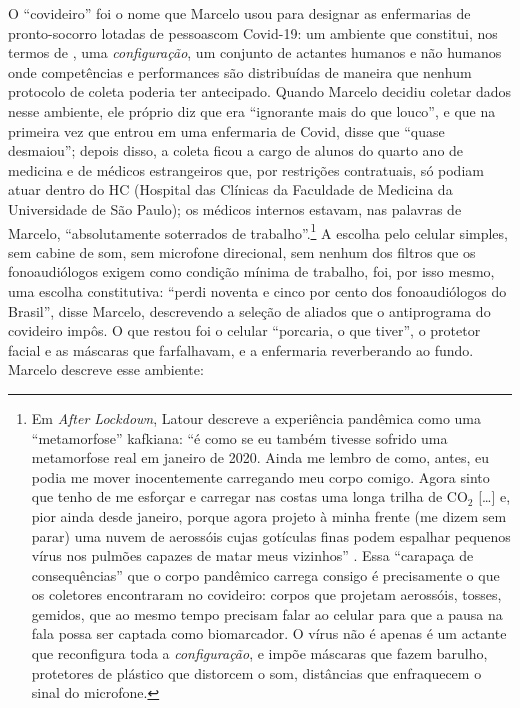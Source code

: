 O \enquote{covideiro} foi o nome que Marcelo usou para designar as enfermarias de pronto-socorro lotadas de pessoascom Covid-19: um ambiente que constitui, nos termos de \textcite{Akrich1992Description}, uma \textit{configuração}, um conjunto de actantes humanos e não humanos onde competências e performances são distribuídas de maneira que nenhum protocolo de coleta poderia ter antecipado. Quando Marcelo decidiu coletar dados nesse ambiente, ele próprio diz que era \enquote{ignorante mais do que louco}, e que na primeira vez que entrou em uma enfermaria de Covid, disse que \enquote{quase desmaiou}; depois disso, a coleta ficou a cargo de alunos do quarto ano de medicina e de médicos estrangeiros que, por restrições contratuais, só podiam atuar dentro do HC (Hospital das Clínicas da Faculdade de Medicina da Universidade de São Paulo); os médicos internos estavam, nas palavras de Marcelo, \enquote{absolutamente soterrados de trabalho}.\footnote{Em \textit{After Lockdown}, Latour descreve a experiência pandêmica como uma \enquote{metamorfose} kafkiana: \enquote{é como se eu também tivesse sofrido uma metamorfose real em janeiro de 2020. Ainda me lembro de como, antes, eu podia me mover inocentemente carregando meu corpo comigo. Agora sinto que tenho de me esforçar e carregar nas costas uma longa trilha de CO$_2$ [\ldots] e, pior ainda desde janeiro, porque agora projeto à minha frente (me dizem sem parar) uma nuvem de aerossóis cujas gotículas finas podem espalhar pequenos vírus nos pulmões capazes de matar meus vizinhos} \textcite[p.~4]{Latour2021AfterLockdown}. Essa \enquote{carapaça de consequências} que o corpo pandêmico carrega consigo é precisamente o que os coletores encontraram no covideiro: corpos que projetam aerossóis, tosses, gemidos, que ao mesmo tempo precisam falar ao celular para que a pausa na fala possa ser captada como biomarcador. O vírus não é apenas é um actante que reconfigura toda a \textit{configuração}, e impõe máscaras que fazem barulho, protetores de plástico que distorcem o som, distâncias que enfraquecem o sinal do microfone.} A escolha pelo celular simples, sem cabine de som, sem microfone direcional, sem nenhum dos filtros que os fonoaudiólogos exigem como condição mínima de trabalho, foi, por isso mesmo, uma escolha constitutiva: \enquote{perdi noventa e cinco por cento dos fonoaudiólogos do Brasil}, disse Marcelo, descrevendo a seleção de aliados que o antiprograma do covideiro impôs. O que restou foi o celular \enquote{porcaria, o que tiver}, o protetor facial e as máscaras que farfalhavam, e a enfermaria reverberando ao fundo. Marcelo descreve esse ambiente:

